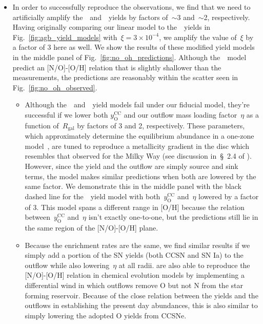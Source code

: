 \documentclass[ms.tex]{subfiles}
\begin{document}
\begin{itemize}
	\item In order to successfully reproduce the observations, we find that we 
	need to artificially amplify the~\cristallo~and~\ventura~yields by factors 
	of~$\sim$3 and~$\sim$2, respectively. 
	Having originally comparing our linear model to the~\cristallo~yields in 
	Fig.~\ref{fig:agb_yield_models} with~$\xi = 3\times10^{-4}$, we amplify the 
	value of~$\xi$ by a factor of 3 here as well. 
	We show the results of these modified yield models in the middle panel of 
	Fig.~\ref{fig:no_oh_predictions}. 
	Although the~\ventura~model predict an [N/O]-[O/H] relation that is 
	slightly shallower than the~\citet{Dopita2016} measurements, the 
	predictions are reasonably within the scatter seen in 
	Fig.~\ref{fig:no_oh_observed}. 
	\begin{itemize}
		\item Although the~\cristallo~and~\ventura~yield models fail under our
		fiducial model, they're successful if we lower both
		$y_\text{O}^\text{CC}$ and our outflow mass loading factor~$\eta$ as a
		function of~$R_\text{gal}$ by factors of 3 and 2, respectively.
		These parameters, which approximately determine the equilibrium
		abundance in a one-zone model~\citep{Weinberg2017}, are tuned to
		reproduce a metallicity gradient in the disc which resembles that
		observed for the Milky Way (see discussion in~\S~2.4 of
		\citealp{Johnson2021}).
		However, since the yield and the outflow are simply source and sink
		terms, the model makes similar predictions when both are lowered by the
		same factor.
		We demonstrate this in the middle panel with the black dashed line for
		the~\cristallo~yield model with both~$y_\text{O}^\text{CC}$ and~$\eta$
		lowered by a factor of 3.
		This model spans a different range in [O/H] because the relation
		between~$y_\text{O}^\text{CC}$ and~$\eta$ isn't exactly one-to-one, but
		the predictions still lie in the same region of the [N/O]-[O/H] plane.

		\item Because the enrichment rates are the same, we find similar
		results if we simply add a portion of the SN yields (both CCSN
		and SN Ia) to the outflow while also lowering~$\eta$ at all radii.
		\citet{Vincenzo2016a} are also able to reproduce the [N/O]-[O/H]
		relation in chemical evolution models by implementing a differential
		wind in which outflows remove O but not N from the star forming
		reservoir.
		Because of the close relation between the yields and the outflows in
		establishing the present day abundances, this is also similar to simply
		lowering the adopted O yields from CCSNe.


\end{itemize}
\end{itemize}
\end{document}
